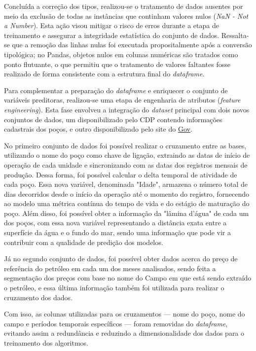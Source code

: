 Concluída a correção dos tipos, realizou-se o tratamento de dados ausentes por meio da exclusão de todas as instâncias que continham valores nulos (\textit{NaN - Not a Number}). Esta ação visou mitigar o risco de erros durante a etapa de treinamento e assegurar a integridade estatística do conjunto de dados. Ressalta-se que a remoção das linhas nulas foi executada propositalmente após a conversão tipológica; no Pandas, objetos nulos em colunas numéricas são tratados como ponto flutuante, o que permitiu que o tratamento de valores faltantes fosse realizado de forma consistente com a estrutura final do \textit{dataframe}.

Para complementar a preparação do \textit{dataframe} e enriquecer o conjunto de variáveis preditoras, realizou-se uma etapa de engenharia de atributos (\textit{feature engineering}). Esta fase envolveu a integração do \textit{dataset} principal com dois novos conjuntos de dados, um disponibilizado pelo \gls{CDP} contendo informações cadastrais dos poços, e outro disponibilizado pelo site do \href{https://www.gov.br/anp/pt-br/assuntos/royalties-e-outras-participacoes/preco-de-referencia-do-petroleo}{Gov}.

No primeiro conjunto de dados foi possível realizar o cruzamento entre as bases, utilizando o nome do poço como chave de ligação, extraindo as datas de início de operação de cada unidade e sincronizando com as datas dos registros mensais de produção. Dessa forma, foi possível calcular o delta temporal de atividade de cada poço. Essa nova variável, denominada "Idade", armazena o número total de dias decorridos desde o início da operação até o momento do registro, fornecendo ao modelo uma métrica contínua do tempo de vida e do estágio de maturação do poço. Além disso, foi possível obter a informação da "lâmina d'água" de cada um dos poços, com essa nova variável representando a distância exata entre a superfície da água e o fundo do mar, sendo uma informação que pode vir a contribuir com a qualidade de predição dos modelos.

Já no segundo conjunto de dados, foi possível obter dados acerca do preço de referência do petróleo em cada um dos meses analisados, sendo feita a segmentação dos preços com base no nome do Campo em que está sendo extraído o petróleo, e essa última informação também foi utilizada para realizar o cruzamento dos dados.

Com isso, as colunas utilizadas para os cruzamentos — nome do poço, nome do campo e períodos temporais específicos — foram removidas do \textit{dataframe}, evitando assim a redundância e reduzindo a dimensionalidade dos dados para o treinamento dos algoritmos.

